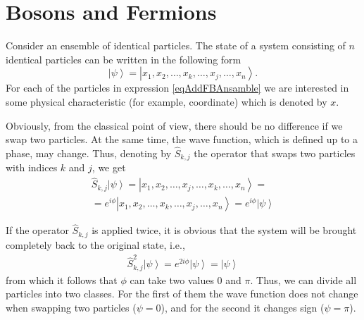 \section{Bosons and Fermions}
\label{AddFermionBoson}

Consider an ensemble of identical particles. The state of a system consisting
of $n$ identical particles can be written in the following form
\begin{equation}
  \left|\psi\right> = \left|x_1, x_2, \dots, x_k, \dots, x_j, \dots,
  x_n\right>.
  \label{eqAddFBAnsamble}
\end{equation}
For each of the particles in expression \eqref{eqAddFBAnsamble} we
are interested in some physical characteristic (for example, coordinate)
which is denoted by $x$.

Obviously, from the classical point of view, there should be no difference if we swap two
particles. At the same time, the wave function, which is defined up to
a phase, may change. Thus, denoting by
$\hat{S}_{k,j}$ the operator that swaps two particles with
indices $k$ and $j$, we get 
\begin{eqnarray}
  \hat{S}_{k, j} \left|\psi\right> = \left|x_1, x_2, \dots, x_j,
  \dots, x_k, \dots,  x_n\right> =
  \nonumber \\
  = e^{i \phi} \left|x_1, x_2, \dots, x_k, \dots, x_j, \dots,
  x_n\right> = e^{i \phi} \left|\psi\right>
  \nonumber
\end{eqnarray}

If the operator $\hat{S}_{k,j}$ is applied twice, it is obvious that
the system will be brought completely back to the original state, i.e.,
\begin{eqnarray}
  \hat{S}_{k, j}^2 \left|\psi\right> =
  e^{2 i \phi} \left|\psi\right> = \left|\psi\right>
  \nonumber
\end{eqnarray}
from which it follows that $\phi$ can take two values $0$ and $\pi$.
Thus, we can divide all particles into two classes. For
the first of them the wave function does not change when swapping two
particles ($\psi = 0$), and for the second it changes sign ($\psi = \pi$).

